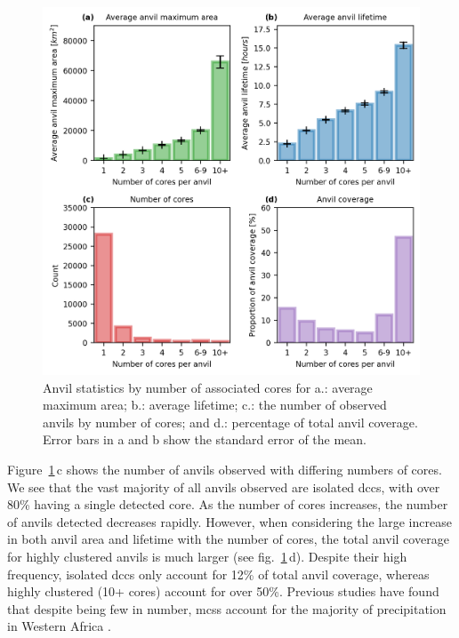 \begin{figure}[tp]
    \includegraphics[width=\textwidth]{figures/ch3_06.png}
    \caption[
    Anvil statistics by number of associated cores for average maximum area, average lifetime, occurrence of anvils by number of cores, and percentage of total anvil coverage
    ]{
    Anvil statistics by number of associated cores for a.: average maximum area; b.: average lifetime; c.: the number of observed anvils by number of cores; and d.: percentage of total anvil coverage. Error bars in a and b show the standard error of the mean.
    }
    \label{fig:seviri_anvil_stats}
\end{figure}


Figure~\ref{fig:seviri_anvil_stats}\,c shows the number of anvils observed with differing numbers of cores. 
We see that the vast majority of all anvils observed are isolated \acrshort{dcc}s, with over 80\% having a single detected core. 
As the number of cores increases, the number of anvils detected decreases rapidly. 
However, when considering the large increase in both anvil area and lifetime with the number of cores, the total anvil coverage for highly clustered anvils is much larger (see fig.~\ref{fig:seviri_anvil_stats}\,d). 
Despite their high frequency, isolated \acrshort{dcc}s only account for 12\% of total anvil coverage, whereas highly clustered (10+ cores) account for over 50\%. 
Previous studies have found that despite being few in number, \acrshort{mcs}s account for the majority of precipitation in Western Africa \citep{vizy_understanding_2019}.

